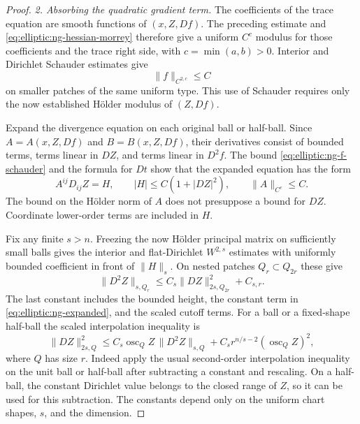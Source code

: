 \begin{proof}
\medskip\noindent\emph{2. Absorbing the quadratic gradient term.}
The coefficients of the trace equation are smooth functions of
$(x,Z,Df)$.  The preceding estimate and \eqref{eq:elliptic:ng-hessian-morrey}
therefore give a uniform $C^c$ modulus for those coefficients and
the trace right side, with $c=\min(a,b)>0$.  Interior and Dirichlet
Schauder estimates give
\begin{equation}\label{eq:elliptic:ng-f-schauder}
 \|f\|_{C^{2,c}}\le C
\end{equation}
on smaller patches of the same uniform type.  This use of Schauder
requires only the now established H\"older modulus of $(Z,Df)$.

Expand the divergence equation on each original ball or half-ball.
Since $A=A(x,Z,Df)$ and $B=B(x,Z,Df)$, their derivatives consist of
bounded terms, terms linear in $DZ$, and terms linear in $D^2f$.
The bound \eqref{eq:elliptic:ng-f-schauder} and the formula for $Dt$ show that
the expanded equation has the form
\begin{equation}\label{eq:elliptic:ng-expanded}
 A^{ij}D_{ij}Z=H,
 \qquad |H|\le C(1+|DZ|^2),
 \qquad \|A\|_{C^c}\le C.
\end{equation}
The bound on the H\"older norm of $A$ does not presuppose a bound for
$DZ$.  Coordinate lower-order terms are included in $H$.

Fix any finite $s>n$.  Freezing the now H\"older principal matrix
on sufficiently small balls gives the interior and flat-Dirichlet
$W^{2,s}$ estimates with uniformly bounded coefficient in front of
$\|H\|_s$.  On nested patches $Q_r\subset Q_{2r}$ these give
\begin{equation}\label{eq:elliptic:ng-local-w2s}
 \|D^2Z\|_{s,Q_r}
 \le C_s\|DZ\|_{2s,Q_{2r}}^2+C_{s,r}.
\end{equation}
The last constant includes the bounded height, the constant term
in \eqref{eq:elliptic:ng-expanded}, and the scaled cutoff terms.
For a ball or a fixed-shape half-ball the scaled interpolation
inequality is
\begin{equation}\label{eq:elliptic:ng-interpolation}
 \|DZ\|_{2s,Q}^2
 \le C_s\operatorname{osc}_Q Z\,\|D^2Z\|_{s,Q}
   +C_s r^{n/s-2}(\operatorname{osc}_Q Z)^2,
\end{equation}
where $Q$ has size $r$.  Indeed apply the usual second-order
interpolation inequality on the unit ball or half-ball after
subtracting a constant and rescaling.  On a half-ball, the constant
Dirichlet value belongs to the closed range of $Z$, so it can be
used for this subtraction.  The constants depend only on the
uniform chart shapes, $s$, and the dimension.


\end{proof}
